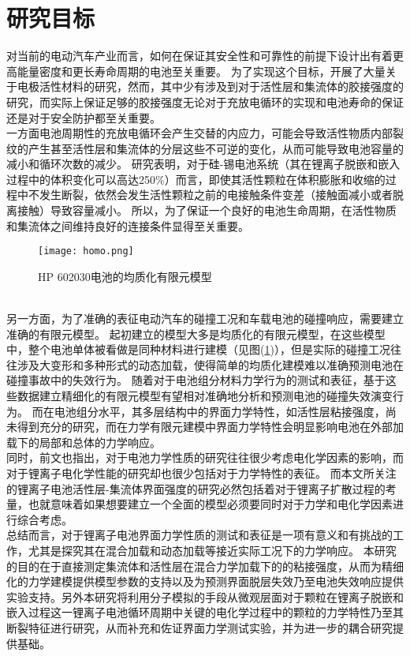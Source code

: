 \section{研究目标}
对当前的电动汽车产业而言，如何在保证其安全性和可靠性的前提下设计出有着更高能量密度和更长寿命周期的电池至关重要。 为了实现这个目标，开展了大量关于电极活性材料的研究\cite{Cheng2011Functional,Park2015LiFeO2}，然而，其中少有涉及到对于活性层和集流体的胶接强度的研究，而实际上保证足够的胶接强度无论对于充放电循环的实现和电池寿命的保证还是对于安全防护都至关重要\cite{Chen2013Unveiling}。\\
\indent 一方面电池周期性的充放电循环会产生交替的内应力，可能会导致活性物质内部裂纹的产生甚至活性层和集流体的分层这些不可逆的变化，从而可能导致电池容量的减小和循环次数的减少\cite{Vetter2005Ageing}。 研究表明，对于硅-锡电池系统（其在锂离子脱嵌和嵌入过程中的体积变化可以高达250\%）而言，即使其活性颗粒在体积膨胀和收缩的过程中不发生断裂，依然会发生活性颗粒之前的电接触条件变差（接触面减小或者脱离接触）导致容量减小\cite{Chen2003A,Chen2003Large}。 所以，为了保证一个良好的电池生命周期，在活性物质和集流体之间维持良好的连接条件显得至关重要。
\begin{figure}
\centering   
\texttt{[image: homo.png]}
\caption{HP 602030电池的均质化有限元模型}
\label{fig:homo}
\end{figure}\\
\indent 另一方面，为了准确的表征电动汽车的碰撞工况和车载电池的碰撞响应，需要建立准确的有限元模型。 起初建立的模型大多是均质化的有限元模型，在这些模型中，整个电池单体被看做是同种材料进行建模（见图(\ref{fig:homo})），但是实际的碰撞工况往往涉及大变形和多种形式的动态加载，使得简单的均质化建模难以准确预测电池在碰撞事故中的失效行为\cite{Luo2018Adhesion}。 随着对于电池组分材料力学行为的测试和表征，基于这些数据建立精细化的有限元模型有望相对准确地分析和预测电池的碰撞失效演变行为\cite{Lu2013A}。 而在电池组分水平，其多层结构中的界面力学特性，如活性层粘接强度，尚未得到充分的研究，而在力学有限元建模中界面力学特性会明显影响电池在外部加载下的局部和总体的力学响应。\\
\indent 同时，前文也指出，对于电池力学性质的研究往往很少考虑电化学因素的影响，而对于锂离子电化学性能的研究却也很少包括对于力学特性的表征。 而本文所关注的锂离子电池活性层-集流体界面强度的研究必然包括着对于锂离子扩散过程的考量，也就意味着如果想要建立一个全面的模型必须要同时对于力学和电化学因素进行综合考虑。\\
\indent 总结而言，对于锂离子电池界面力学性质的测试和表征是一项有意义和有挑战的工作，尤其是探究其在混合加载和动态加载等接近实际工况下的力学响应。 本研究的目的在于直接测定集流体和活性层在混合力学加载下的的粘接强度，从而为精细化的力学建模提供模型参数的支持以及为预测界面脱层失效乃至电池失效响应提供实验支持。另外本研究将利用分子模拟的手段从微观层面对于颗粒在锂离子脱嵌和嵌入过程这一锂离子电池循环周期中关键的电化学过程中的颗粒的力学特性乃至其断裂特征进行研究，从而补充和佐证界面力学测试实验，并为进一步的耦合研究提供基础。
